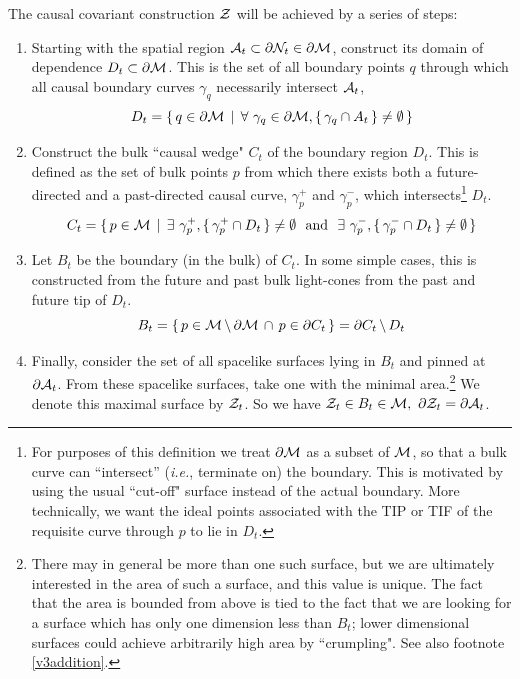 \documentclass[12pt]{article}
\def\ie{{\it i.e.}}
\def\p{\partial}
\def\CA{{\cal A}}
\def\CZ{{\cal Z}}
\def\p{\partial}
\def\p{\partial}
\def\bulk{{\cal M}}
\def\bdy{\p{\cal M}}
\def\bdys{\p{\cal N}}
\def\Cms{\CZ}
\def\rA{\CA}
\def\brA{\p \CA}
\def\curt#1{\gamma_{#1}}
\def\curf#1{\gamma_{#1}^+}
\def\curp#1{\gamma_{#1}^-}
\def\set#1{\{ \, #1 \, \}}
\def\st{ \, \mid \, }
\begin{document}
The causal covariant construction $\Cms$ will be achieved by a series of steps:
\begin{enumerate}
\item
Starting with the spatial region $\rA_t \subset \bdys_t \in \bdy$, construct
its domain of dependence
$D_t \subset \bdy$.  This is the set of all boundary points $q$
through which all causal boundary curves $\curt q$ necessarily intersect $\rA_t$,
\begin{equation}
D_t = \set{q \in \bdy \st \forall \ \curt q \in \bdy,  \set{\curt q \cap A_t}
\ne \emptyset }
\end{equation}
\item
Construct the bulk ``causal wedge" $C_t$ of the boundary
region $D_t$.  This is defined as the set of bulk
points $p$ from which there exists both a future-directed and a
past-directed causal curve, $\curf p$ and $\curp p$, which intersects\footnote{
For purposes of this definition
we treat $\bdy$ as a subset of $\bulk$, so that a bulk
curve can ``intersect'' (\ie, terminate on) the boundary.
This is motivated by using the usual ``cut-off" surface instead of the actual boundary.
More technically, we want the ideal points associated with the TIP or
 TIF of the requisite curve through $p$ to lie in $D_t$.
} $D_t$.
%
\begin{equation}
C_t = \set{p \in \bulk \st
\exists \ \curf p ,  \set{\curf p \cap D_t} \ne \emptyset
\ \ {\rm and} \ \
\exists \ \curp p ,  \set{\curp p \cap D_t} \ne \emptyset  }
\end{equation}
%
\item
Let $B_t$ be the boundary (in the bulk) of $C_t$.
In some simple cases, this is constructed from the
future and past bulk light-cones from the past and future tip of $D_t$.
%
\begin{equation}
B_t = \set{ p \in \bulk \, \backslash \, \bdy \, \cap \, p \in \p C_t}
= \p C_t \, \backslash \, D_t
\end{equation}
%
\item
Finally, consider the set of all spacelike surfaces
lying in $B_t$ and pinned at $\brA_t$.
From these spacelike surfaces, take one with the
minimal area.\footnote{There may in general be more
than one such surface, but we are ultimately interested
in the area of such a surface, and this value is unique.
The fact that the area is bounded from above is tied to the
fact that we are looking for a surface which has only one
dimension less than $B_t$; lower dimensional surfaces could
achieve arbitrarily high area by ``crumpling". See also footnote \ref{v3addition}.}  We denote this maximal
surface by $\Cms_t$.
So we have $\Cms_t \in B_t \in \bulk , \ \p \Cms_t = \brA_t  $.
\end{enumerate}
\end{document}
